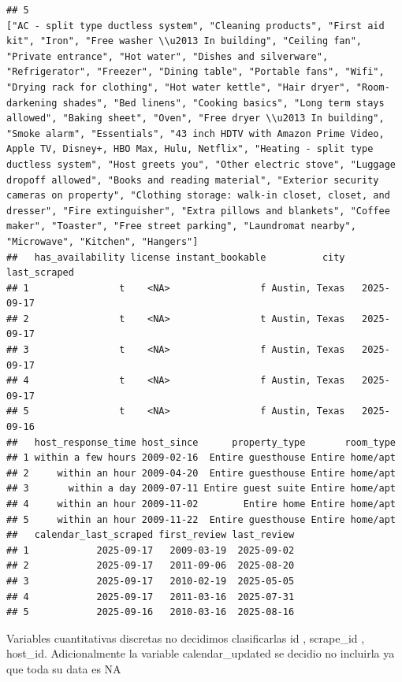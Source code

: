 \documentclass[
]{article}
\begin{document}
\begin{verbatim}
## 5                                                                                                                                                                                                                       ["AC - split type ductless system", "Cleaning products", "First aid kit", "Iron", "Free washer \\u2013 In building", "Ceiling fan", "Private entrance", "Hot water", "Dishes and silverware", "Refrigerator", "Freezer", "Dining table", "Portable fans", "Wifi", "Drying rack for clothing", "Hot water kettle", "Hair dryer", "Room-darkening shades", "Bed linens", "Cooking basics", "Long term stays allowed", "Baking sheet", "Oven", "Free dryer \\u2013 In building", "Smoke alarm", "Essentials", "43 inch HDTV with Amazon Prime Video, Apple TV, Disney+, HBO Max, Hulu, Netflix", "Heating - split type ductless system", "Host greets you", "Other electric stove", "Luggage dropoff allowed", "Books and reading material", "Exterior security cameras on property", "Clothing storage: walk-in closet, closet, and dresser", "Fire extinguisher", "Extra pillows and blankets", "Coffee maker", "Toaster", "Free street parking", "Laundromat nearby", "Microwave", "Kitchen", "Hangers"]
##   has_availability license instant_bookable          city last_scraped
## 1                t    <NA>                f Austin, Texas   2025-09-17
## 2                t    <NA>                t Austin, Texas   2025-09-17
## 3                t    <NA>                f Austin, Texas   2025-09-17
## 4                t    <NA>                f Austin, Texas   2025-09-17
## 5                t    <NA>                f Austin, Texas   2025-09-16
##   host_response_time host_since      property_type       room_type
## 1 within a few hours 2009-02-16  Entire guesthouse Entire home/apt
## 2     within an hour 2009-04-20  Entire guesthouse Entire home/apt
## 3       within a day 2009-07-11 Entire guest suite Entire home/apt
## 4     within an hour 2009-11-02        Entire home Entire home/apt
## 5     within an hour 2009-11-22  Entire guesthouse Entire home/apt
##   calendar_last_scraped first_review last_review
## 1            2025-09-17   2009-03-19  2025-09-02
## 2            2025-09-17   2011-09-06  2025-08-20
## 3            2025-09-17   2010-02-19  2025-05-05
## 4            2025-09-17   2011-03-16  2025-07-31
## 5            2025-09-16   2010-03-16  2025-08-16
\end{verbatim}

Variables cuantitativas discretas no decidimos clasificarlas id ,
scrape\_id , host\_id. Adicionalmente la variable calendar\_updated se
decidio no incluirla ya que toda su data es NA
\end{document}
